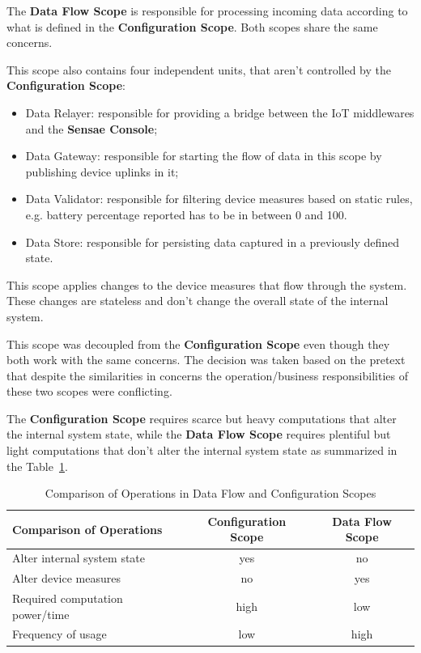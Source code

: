 The \textbf{Data Flow Scope} is responsible for processing incoming data according to what is defined in the \textbf{Configuration Scope}. Both scopes share the same concerns.

This scope also contains four independent units, that aren't controlled by the \textbf{Configuration Scope}:

\begin{itemize}
   \item Data Relayer: responsible for providing a bridge between the \gls{IoT} middlewares and the \textbf{Sensae Console};
   \item Data Gateway: responsible for starting the flow of data in this scope by publishing device uplinks in it;
   \item Data Validator: responsible for filtering device measures based on static rules, e.g. battery percentage reported has to be in between 0 and 100.
   \item Data Store: responsible for persisting data captured in a previously defined state.
\end{itemize}

This scope applies changes to the device measures that flow through the system. These changes are stateless and don't change the overall state of the internal system.

This scope was decoupled from the \textbf{Configuration Scope} even though they both work with the same concerns. The decision was taken based on the pretext that despite the similarities in concerns the operation/business responsibilities of these two scopes were conflicting.

The \textbf{Configuration Scope} requires scarce but heavy computations that alter the internal system state, while the \textbf{Data Flow Scope} requires plentiful but light computations that don't alter the internal system state as summarized in the Table~\ref{tab:design:system_scopes:data_flow_scope:comparison}.

\begin{table}[H]
   \caption[Comparison of Operations in Data Flow and Configuration Scopes]{Comparison of Operations in Data Flow and Configuration Scopes}
   \label{tab:design:system_scopes:data_flow_scope:comparison}
   \centering
   \begin{tabular}{@{}lcc@{}}
   \toprule
   \textbf{Comparison of Operations} & \textbf{Configuration Scope} & \textbf{Data Flow Scope} \\ \midrule
       Alter internal system state & yes & no \\ \hline
       Alter device measures & no & yes \\ \hline
       Required computation power/time & high & low \\ \hline
       Frequency of usage & low & high \\ \hline
   \end{tabular}
\end{table}

